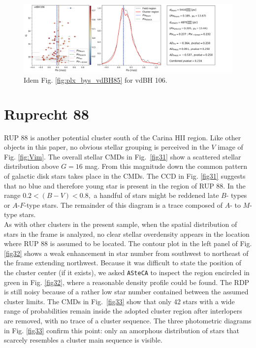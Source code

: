 \documentclass[draft]{aa}
\begin{document}
\begin{figure}[ht]
    \centering
    \includegraphics[width=\hsize]{../figs/plx_vdBH106.png}
    \caption{Idem Fig. \ref{fig:plx_bys_vdBH85} for vdBH 106.}
    \label{fig46}
\end{figure}



\section{Ruprecht 88}

RUP 88 is another potential cluster south of the Carina HII region. Like
other objects in this paper, no obvious stellar grouping is perceived in the $V$
image of Fig. \ref{fig:Vim}. The overall stellar CMDs in Fig.~\ref{fig31} show a
scattered stellar distribution above $G=16$ mag. From this magnitude down the
common pattern of galactic disk stars takes place in the CMDs. The CCD in Fig.
\ref{fig31} suggests that no blue and therefore young star is present in the
region of RUP 88. In the range $0.2<(B-V)<0.8,$  a handful of stars might be reddened late $B$- types or $A$-$F$-type stars. The remainder of
this diagram is a trace composed of $A$- to $M$-type stars.\\

As with other clusters in the present sample, when the spatial distribution
of stars in the frame is analyzed, no clear stellar overdensity
appears in the location where RUP 88 is assumed to be located. The
contour plot in the left panel of Fig. \ref{fig32} shows a weak enhancement in star number from southwest to northeast of the frame extending northwest.
Because it was difficult to state the position of the cluster center (if it
exists), we asked \texttt{ASteCA} to inspect the region encircled in green in Fig.
\ref{fig32}, where a reasonable density profile could be found. The
RDP is still noisy because of a rather low star number contained between the
assumed cluster limits.
The CMDs in Fig.~\ref{fig33} show that only 42 stars with a wide
range of probabilities remain inside the adopted cluster region 
after interlopers are removed, with no trace of a cluster sequence.
The three photometric diagrams in Fig. \ref{fig33} confirm this point: only
an amorphous distribution of stars that scarcely resembles a cluster main sequence
is visible.\\
\end{document}
